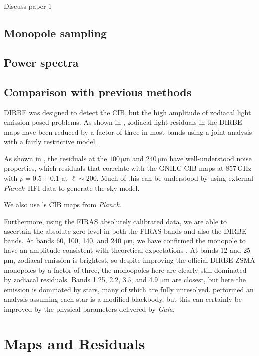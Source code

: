 \documentclass{aa}
\def\Planck{\textit{Planck}}
\begin{document}
Discuss paper 1

\subsection{Monopole sampling}

\subsection{Power spectra}

\subsection{Comparison with previous methods}

DIRBE was designed to detect the CIB, but the high amplitude of zodiacal light emission posed problems. As shown in \citet{CG02_02}, zodiacal light residuals in the DIRBE maps have been reduced by a factor of three in most bands using a joint analysis with a fairly restrictive model.

As shown in \citet{CG02_01}, the residuals at the $100\,\mathrm{\mu m}$ and $240\,\mathrm{\mu m}$ have well-understood noise properties, which residuals that correlate with the GNILC \citet{planck2016-XLVIII} CIB maps at 857\,GHz with $\rho=0.5\pm0.1$ at $\ell\sim200$. Much of this can be understood by using external \Planck\ HFI data to generate the sky model. 

We also use \citet{lenz2019}'s CIB maps from \Planck.

Furthermore, using the FIRAS absolutely calibrated data, we are able to ascertain the absolute zero level in both the FIRAS bands and also the DIRBE bands. At bands 60, 100, 140, and 240 $\mathrm{\mu m}$, we have confirmed the monopole to have an amplitude consistent with theoretical expectations \citep{finke2022}. At bands 12 and 25 $\mathrm{\mu m}$, zodiacal emission is brightest, so despite improving the official DIRBE ZSMA monopoles by a factor of three, the monoopoles here are clearly still dominated by zodiacal residuals. Bands 1.25, 2.2, 3.5, and 4.9 $\mathrm{\mu m}$ are closest, but here the emission is dominated by stars, many of which are fully unresolved. \citet{CG02_01} performed an analysis assuming each star is a modified blackbody, but this can certainly be improved by the physical parameters delivered by \textit{Gaia}.


\section{Maps and Residuals}
\end{document}
